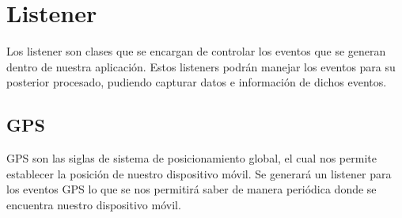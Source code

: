 \section{Listener}

Los listener son clases que se encargan de controlar los eventos que se generan dentro de nuestra aplicación.
Estos listeners podrán manejar los eventos para su posterior procesado, pudiendo capturar datos e información de dichos eventos.

\subsection{GPS}

GPS son las siglas de sistema de posicionamiento global, el cual nos permite establecer la posición de nuestro dispositivo móvil.
Se generará un listener para los eventos GPS lo que se nos permitirá saber de manera periódica donde se encuentra nuestro dispositivo móvil.
